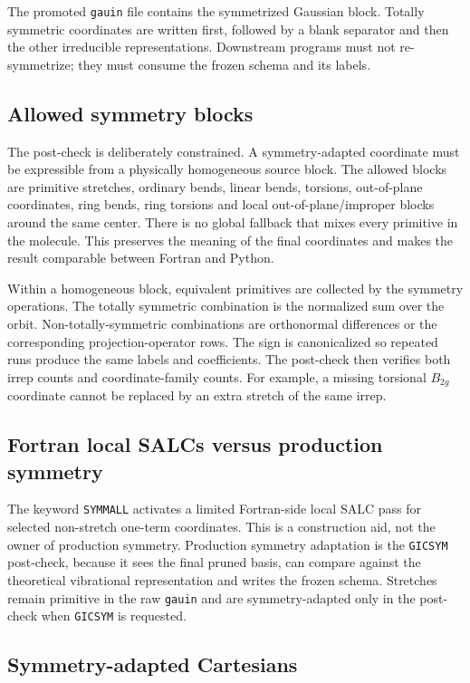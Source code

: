 \documentclass[11pt]{article}
\newcommand{\gauin}{\texttt{gauin}}
\begin{document}
\noindent
The promoted \gauin{} file contains the symmetrized Gaussian block.  Totally
symmetric coordinates are written first, followed by a blank separator and then
the other irreducible representations.  Downstream programs must not
re-symmetrize; they must consume the frozen schema and its labels.

\subsection{Allowed symmetry blocks}

The post-check is deliberately constrained.  A symmetry-adapted coordinate must
be expressible from a physically homogeneous source block.  The allowed blocks
are primitive stretches, ordinary bends, linear bends, torsions, out-of-plane
coordinates, ring bends, ring torsions and local out-of-plane/improper blocks
around the same center.  There is no global fallback that mixes every primitive
in the molecule.  This preserves the meaning of the final coordinates and makes
the result comparable between Fortran and Python.

Within a homogeneous block, equivalent primitives are collected by the symmetry
operations.  The totally symmetric combination is the normalized sum over the
orbit.  Non-totally-symmetric combinations are orthonormal differences or the
corresponding projection-operator rows.  The sign is canonicalized so repeated
runs produce the same labels and coefficients.  The post-check then verifies
both irrep counts and coordinate-family counts.  For example, a missing
torsional \(B_{2g}\) coordinate cannot be replaced by an extra stretch of the
same irrep.

\subsection{Fortran local SALCs versus production symmetry}

The keyword \texttt{SYMMALL} activates a limited Fortran-side local SALC pass
for selected non-stretch one-term coordinates.  This is a construction aid, not
the owner of production symmetry.  Production symmetry adaptation is the
\texttt{GICSYM} post-check, because it sees the final pruned basis, can compare
against the theoretical vibrational representation and writes the frozen
schema.  Stretches remain primitive in the raw \gauin{} and are symmetry-adapted
only in the post-check when \texttt{GICSYM} is requested.

\subsection{Symmetry-adapted Cartesians}
\end{document}

